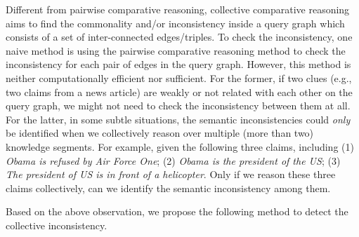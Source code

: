 Different from pairwise comparative reasoning, collective comparative reasoning aims to find the commonality and/or inconsistency inside a query graph which consists of a set of inter-connected edges/triples.
To check the inconsistency, one naive method is using the pairwise comparative reasoning method to check the inconsistency for each pair of edges in the query graph. However, this method is neither computationally efficient nor sufficient. For the former, if two clues (e.g., two claims from a news article) are weakly or not related with each other on the query graph, we might not need to check the inconsistency between them at all. For the latter, in some subtle situations, the semantic inconsistencies could {\em only} be identified when we collectively reason over multiple (more than two) knowledge segments. For example, given the following three claims, including
(1) {\em Obama is refused by Air Force One};
(2) {\em Obama is the president of the US};
(3) {\em The president of US is in front of a helicopter}.
Only if we reason these three claims collectively, can we identify the semantic inconsistency among them.

Based on the above observation, we propose the following method to detect the collective inconsistency.%

